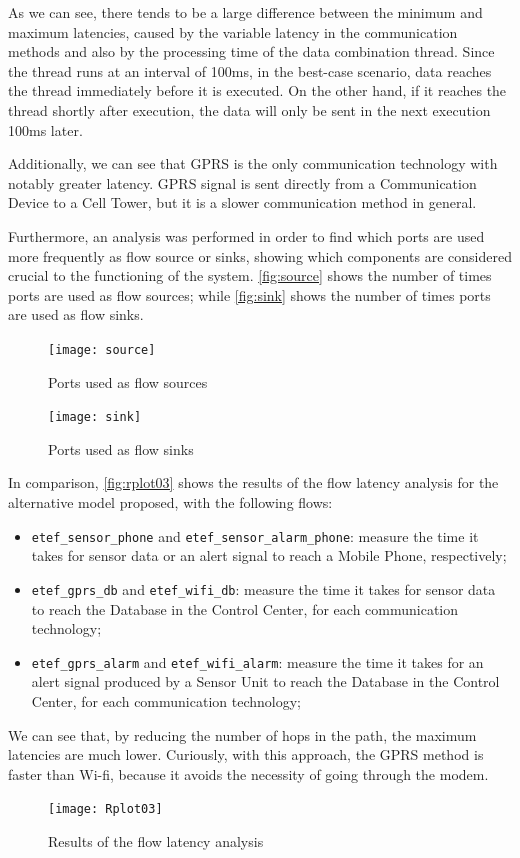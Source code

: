 As we can see, there tends to be a large difference between the minimum and maximum latencies, caused by the variable latency in the communication methods and also by the processing time of the data combination thread. Since the thread runs at an interval of 100ms, in the best-case scenario, data reaches the thread immediately before it is executed. On the other hand, if it reaches the thread shortly after execution, the data will only be sent in the next execution 100ms later.

Additionally, we can see that GPRS is the only communication technology with notably greater latency. GPRS signal is sent directly from a Communication Device to a Cell Tower, but it is a slower communication method in general.

Furthermore, an analysis was performed in order to find which ports are used more frequently as flow source or sinks, showing which components are considered crucial to the functioning of the system. \autoref{fig:source} shows the number of times ports are used as flow sources; while \autoref{fig:sink} shows the number of times ports are used as flow sinks.

\begin{figure}[h]
\caption{Ports used as flow sources}
\label{fig:source}
\centering
\texttt{[image: source]}
\end{figure}

\begin{figure}[h]
\caption{Ports used as flow sinks}
\label{fig:sink}
\centering
\texttt{[image: sink]}
\end{figure}


In comparison, \autoref{fig:rplot03} shows the results of the flow latency analysis for the alternative model proposed, with the following flows:

\begin{itemize}
	\item \texttt{etef\_sensor\_phone} and \texttt{etef\_sensor\_alarm\_phone}: measure the time it takes for sensor data or an alert signal to reach a Mobile Phone, respectively;
	\item \texttt{etef\_gprs\_db} and \texttt{etef\_wifi\_db}: measure the time it takes for sensor data to reach the Database in the Control Center, for each communication technology;
	\item \texttt{etef\_gprs\_alarm} and \texttt{etef\_wifi\_alarm}: measure the time it takes for an alert signal produced by a Sensor Unit to reach the Database in the Control Center, for each communication technology;
\end{itemize}

We can see that, by reducing the number of hops in the path, the maximum latencies are much lower. Curiously, with this approach, the GPRS method is faster than Wi-fi, because it avoids the necessity of going through the modem.

\begin{figure}[h]
\caption{Results of the flow latency analysis}
\label{fig:rplot03}
\centering
\texttt{[image: Rplot03]}
\end{figure}

